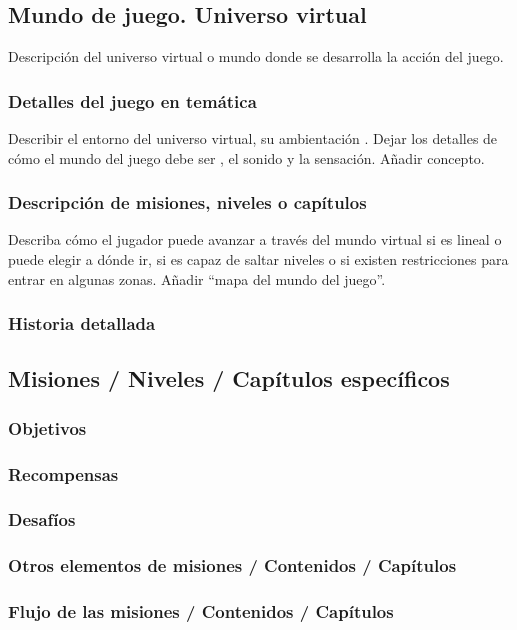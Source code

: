 \subsection{Mundo de juego. Universo virtual}
Descripción del universo virtual o mundo donde se desarrolla la acción del juego.

\subsubsection{Detalles del juego en temática}
Describir el entorno del universo virtual, su ambientación . Dejar los detalles de cómo el mundo del juego debe ser , el sonido y la sensación. Añadir concepto.

\subsubsection{Descripción de misiones, niveles o capítulos}
Describa cómo el jugador puede avanzar a través del mundo virtual si es lineal o puede elegir a dónde ir, si es capaz de saltar niveles o si existen restricciones para entrar en algunas zonas. Añadir “mapa del mundo del juego”.

\subsubsection{Historia detallada}
\subsection{Misiones / Niveles / Capítulos específicos}
\subsubsection{Objetivos}
\subsubsection{Recompensas}
\subsubsection{Desafíos}
\subsubsection{Otros elementos de misiones / Contenidos / Capítulos}
\subsubsection{Flujo de las misiones / Contenidos / Capítulos}
